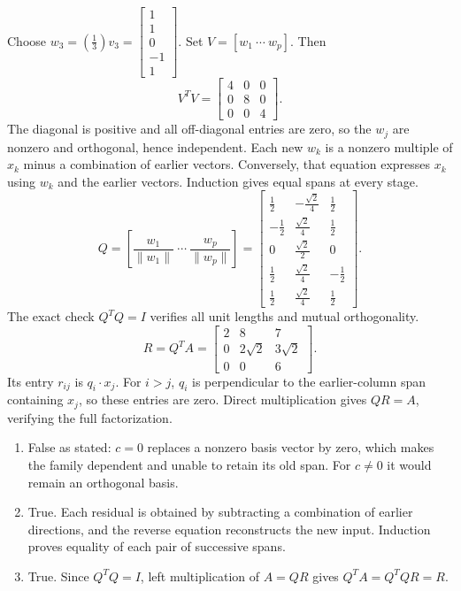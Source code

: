 Choose $w_{3}=(\frac{1}{3})v_{3}=\left[\begin{array}{r}1\\1\\0\\-1\\1\end{array}\right]$.
Set $V=[w_1\ \cdots\ w_p]$. Then
\[V^TV=\left[\begin{array}{rrr}4&0&0\\0&8&0\\0&0&4\end{array}\right].\]
The diagonal is positive and all off-diagonal entries are zero, so the $w_j$ are nonzero and orthogonal, hence independent. Each new $w_k$ is a nonzero multiple of $x_k$ minus a combination of earlier vectors. Conversely, that equation expresses $x_k$ using $w_k$ and the earlier vectors. Induction gives equal spans at every stage.
\[Q=\left[\frac{w_1}{\|w_1\|}\ \cdots\ \frac{w_p}{\|w_p\|}\right]=\left[\begin{array}{rrr}\frac{1}{2}&- \frac{\sqrt{2}}{4}&\frac{1}{2}\\- \frac{1}{2}&\frac{\sqrt{2}}{4}&\frac{1}{2}\\0&\frac{\sqrt{2}}{2}&0\\\frac{1}{2}&\frac{\sqrt{2}}{4}&- \frac{1}{2}\\\frac{1}{2}&\frac{\sqrt{2}}{4}&\frac{1}{2}\end{array}\right].\]
The exact check $Q^TQ=I$ verifies all unit lengths and mutual orthogonality.
\[R=Q^TA=\left[\begin{array}{rrr}2&8&7\\0&2 \sqrt{2}&3 \sqrt{2}\\0&0&6\end{array}\right].\]
Its entry $r_{ij}$ is $q_i\cdot x_j$. For $i>j$, $q_i$ is perpendicular to the earlier-column span containing $x_j$, so these entries are zero. Direct multiplication gives $QR=A$, verifying the full factorization.

\begin{enumerate}[label=(\alph*)]
\item False as stated: $c=0$ replaces a nonzero basis vector by zero,
which makes the family dependent and unable to retain its old span.
For $c\ne0$ it would remain an orthogonal basis.
\item True. Each residual is obtained by subtracting a combination of
earlier directions, and the reverse equation reconstructs the new input.
Induction proves equality of each pair of successive spans.
\item True. Since $Q^TQ=I$, left multiplication of $A=QR$ gives
$Q^TA=Q^TQR=R$.
\end{enumerate}

